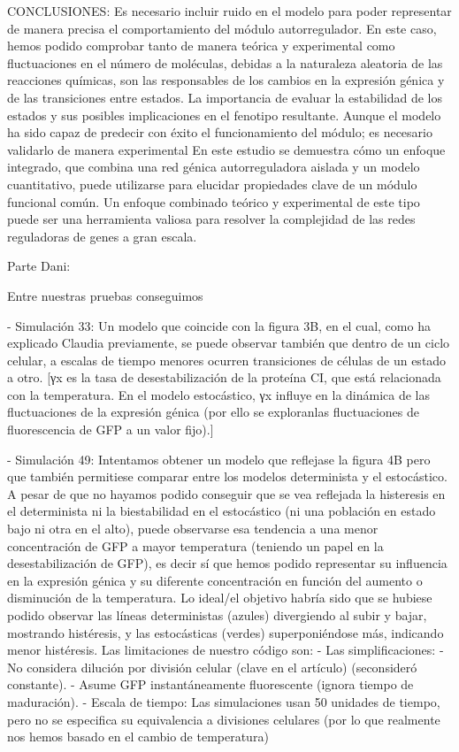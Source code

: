 CONCLUSIONES:
	Es necesario incluir ruido en el modelo para poder representar de manera precisa el comportamiento del módulo autorregulador. En este caso, hemos podido comprobar tanto de manera teórica y experimental como fluctuaciones en el número de moléculas, debidas a la naturaleza aleatoria de las reacciones químicas, son las responsables de los cambios en la expresión génica y de las transiciones entre estados. 
	La importancia de evaluar la estabilidad de los estados y sus posibles implicaciones en el fenotipo resultante.
	Aunque el modelo ha sido capaz de predecir con éxito el funcionamiento del módulo; es necesario validarlo de manera experimental
	En este estudio se demuestra cómo un enfoque integrado, que combina una red génica autorreguladora aislada y un modelo cuantitativo, puede utilizarse para elucidar propiedades clave de un módulo funcional común. Un enfoque combinado teórico y experimental de este tipo puede ser una herramienta valiosa para resolver la complejidad de las redes reguladoras de genes a gran escala.

Parte Dani:

Entre nuestras pruebas conseguimos

- Simulación 33: Un modelo que coincide con la figura 3B, en el cual, como ha explicado Claudia previamente, se puede observar también que dentro de un ciclo celular, a escalas de tiempo menores ocurren transiciones de células de un estado a otro.
	[γx es la tasa de desestabilización de la proteína CI, que está relacionada con la temperatura. En el modelo estocástico, γx influye en la dinámica de las fluctuaciones de la expresión génica (por ello se exploranlas fluctuaciones de  fluorescencia de GFP a un valor fijo).]

- Simulación 49: Intentamos obtener un modelo que reflejase la figura 4B pero que también permitiese comparar entre los modelos determinista y el estocástico. A pesar de que no hayamos podido conseguir que se vea reflejada la histeresis en el determinista ni la biestabilidad en el estocástico (ni una población en estado bajo ni otra en el alto), puede observarse esa tendencia a una menor concentración de GFP a mayor temperatura (teniendo un papel en la desestabilización de GFP), es decir sí que hemos podido representar su influencia en la expresión génica y su diferente concentración en función del aumento o disminución de la temperatura. 
Lo ideal/el objetivo habría sido que se hubiese podido observar las líneas deterministas (azules) divergiendo al subir y bajar, mostrando histéresis, y las estocásticas (verdes) superponiéndose más, indicando menor histéresis. 
Las limitaciones de nuestro código son:
- Las simplificaciones: 
	- No considera dilución por división celular (clave en el artículo) (seconsideró constante). 
	- Asume GFP instantáneamente fluorescente (ignora tiempo de maduración). 
- Escala de tiempo: Las simulaciones usan 50 unidades de tiempo, pero no se especifica su equivalencia a divisiones celulares (por lo que realmente nos hemos basado en el cambio de temperatura)
	

